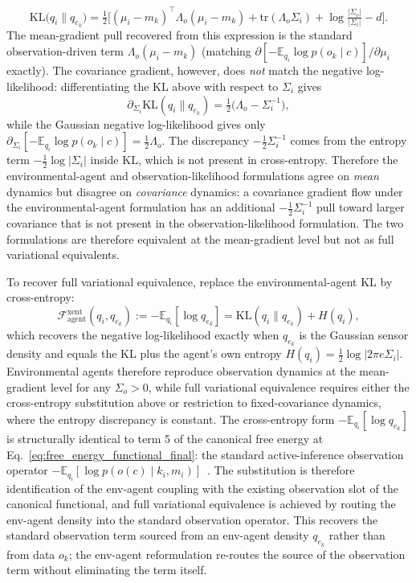 \documentclass[11pt]{article}
\begin{document}
\begin{equation}
\mathrm{KL}\big(q_i \| q_{e_k}\big) = \tfrac{1}{2}\big[(\mu_i - m_k)^\top \Lambda_o (\mu_i - m_k) + \mathrm{tr}(\Lambda_o \Sigma_i) + \log\tfrac{|\Sigma_o|}{|\Sigma_i|} - d\big].
\end{equation}
The mean-gradient pull recovered from this expression is the standard observation-driven term $\Lambda_o(\mu_i - m_k)$ (matching $\partial[-\mathbb{E}_{q_i}\log p(o_k \mid c)]/\partial\mu_i$ exactly). The covariance gradient, however, does \emph{not} match the negative log-likelihood: differentiating the KL above with respect to $\Sigma_i$ gives
\begin{equation}
\partial_{\Sigma_i}\mathrm{KL}(q_i \| q_{e_k}) = \tfrac{1}{2}\big(\Lambda_o - \Sigma_i^{-1}\big),
\end{equation}
while the Gaussian negative log-likelihood gives only $\partial_{\Sigma_i}[-\mathbb{E}_{q_i}\log p(o_k \mid c)] = \tfrac{1}{2}\Lambda_o$. The discrepancy $-\tfrac{1}{2}\Sigma_i^{-1}$ comes from the entropy term $-\tfrac{1}{2}\log|\Sigma_i|$ inside KL, which is not present in cross-entropy. Therefore the environmental-agent and observation-likelihood formulations agree on \emph{mean} dynamics but disagree on \emph{covariance} dynamics: a covariance gradient flow under the environmental-agent formulation has an additional $-\tfrac{1}{2}\Sigma_i^{-1}$ pull toward larger covariance that is not present in the observation-likelihood formulation. The two formulations are therefore equivalent at the mean-gradient level but not as full variational equivalents.

To recover full variational equivalence, replace the environmental-agent KL by cross-entropy:
\begin{equation}
\mathcal{F}_{\text{agent}}^{\mathrm{xent}}(q_i, q_{e_k}) := -\mathbb{E}_{q_i}[\log q_{e_k}] = \mathrm{KL}(q_i \| q_{e_k}) + H(q_i),
\label{eq:xent_resolution}
\end{equation}
which recovers the negative log-likelihood exactly when $q_{e_k}$ is the Gaussian sensor density and equals the KL plus the agent's own entropy $H(q_i) = \tfrac{1}{2}\log|2\pi e \Sigma_i|$. Environmental agents therefore reproduce observation dynamics at the mean-gradient level for any $\Sigma_o > 0$, while full variational equivalence requires either the cross-entropy substitution above or restriction to fixed-covariance dynamics, where the entropy discrepancy is constant. The cross-entropy form $-\mathbb{E}_{q_i}[\log q_{e_k}]$ is structurally identical to term 5 of the canonical free energy at Eq.~\eqref{eq:free_energy_functional_final}: the standard active-inference observation operator $-\mathbb{E}_{q_i}[\log p(o(c)\mid k_i, m_i)]$~\cite{Friston2010, parr2022active}. The substitution is therefore identification of the env-agent coupling with the existing observation slot of the canonical functional, and full variational equivalence is achieved by routing the env-agent density into the standard observation operator. This recovers the standard observation term sourced from an env-agent density $q_{e_k}$ rather than from data $o_k$; the env-agent reformulation re-routes the source of the observation term without eliminating the term itself.
\end{document}

